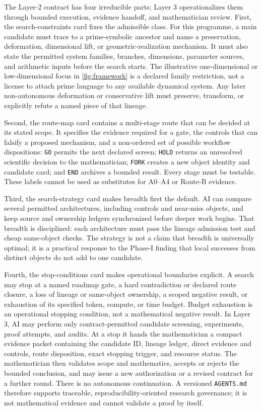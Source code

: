 The Layer-2 contract has four irreducible parts; Layer 3 operationalizes them
through bounded execution, evidence handoff, and mathematician review. First,
the search-constraints card fixes the admissible class. For this programme, a
main candidate must trace to a prime-symbolic ancestor and name a preservation,
deformation, dimensional lift, or geometric-realization mechanism. It must
also state the permitted system families, branches, dimensions, parameter
sources, and arithmetic inputs before the search starts. The illustrative
one-dimensional or low-dimensional focus in \cref{fig:framework} is a declared
family restriction, not a license to attach prime language to any available
dynamical system. Any later non-autonomous deformation or conservative lift
must preserve, transform, or explicitly refute a named piece of that lineage.

Second, the route-map card contains a multi-stage route that can be decided at
its stated scope. It specifies the evidence required for a gate, the controls
that can falsify a proposed mechanism, and a non-ordered set of possible
workflow dispositions: \texttt{GO} permits the next declared screen;
\texttt{HOLD} returns an unresolved scientific decision to the mathematician;
\texttt{FORK} creates a new object identity and candidate card; and
\texttt{END} archives a bounded result. Every stage must be testable. These
labels cannot be used as substitutes for A0--A4 or Route-B evidence.

Third, the search-strategy card makes breadth first the default. AI can compare
several permitted architectures, including controls and near-miss objects, and
keep source and ownership ledgers synchronized before deeper work begins. That
breadth is disciplined: each architecture must pass the lineage admission test
and cheap same-object checks. The strategy is not a claim that breadth is
universally optimal; it is a practical response to the Phase-I finding that
local successes from distinct objects do not add to one candidate.

Fourth, the stop-conditions card makes operational boundaries explicit. A
search may stop at a named roadmap gate, a hard contradiction or declared route
closure, a loss of lineage or same-object ownership, a scoped negative result,
or exhaustion of its specified token, compute, or time budget. Budget
exhaustion is an operational stopping condition, not a mathematical negative
result. In Layer 3, AI may perform only contract-permitted candidate screening,
experiments, proof attempts, and audits. At a stop it hands the mathematician a
compact evidence packet containing the candidate ID, lineage ledger, direct
evidence and controls, route disposition, exact stopping trigger, and resource
status. The mathematician then validates scope and mathematics, accepts or
rejects the bounded conclusion, and may issue a new authorization or a revised
contract for a further round. There is no autonomous continuation. A versioned
\texttt{AGENTS.md} therefore supports traceable, reproducibility-oriented
research governance; it is not mathematical evidence and cannot validate a
proof by itself.

